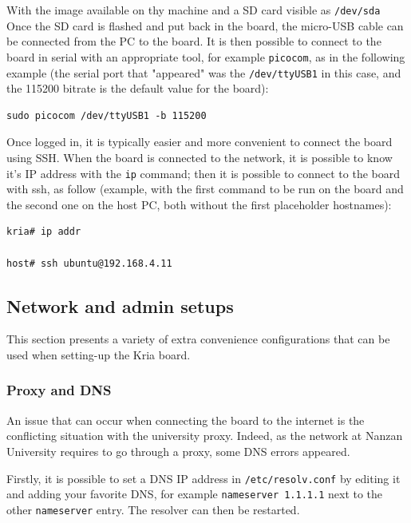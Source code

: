 \documentclass[10pt]{article}
\begin{document}
With the image available on thy machine and a SD card visible as \texttt{/dev/sda}
Once the SD card is flashed and put back in the board, the micro-USB cable can be
connected from the PC to the board. It is then possible to
connect to the board in serial with an appropriate tool, for example \texttt{picocom},
as in the following example (the serial port that "appeared" was the \texttt{/dev/ttyUSB1} in this case,
and the 115200 bitrate is the default value for the board):

\begin{verbatim}
sudo picocom /dev/ttyUSB1 -b 115200
\end{verbatim}

Once logged in, it is typically easier and more convenient to connect the board
using SSH. When the board is connected to the network, it is possible to know
it's IP address with the \texttt{ip} command; then it is possible to connect to
the board with ssh, as follow (example, with the first command to be run on the board
and the second one on the host PC, both without the first placeholder hostnames):


\begin{verbatim}
kria# ip addr

host# ssh ubuntu@192.168.4.11
\end{verbatim}

\subsection{Network and admin setups}
\label{sec:org2ed0e6b}
This section presents a variety of extra convenience configurations
that can be used when setting-up the Kria board.

\subsubsection{Proxy and DNS}
\label{sec:orgc8a7783}
An issue that can occur when connecting the board to the internet is the
conflicting situation with the university proxy.
Indeed, as the network at Nanzan University requires to go through a proxy,
some DNS errors appeared.

Firstly, it is possible to set a DNS IP address in \texttt{/etc/resolv.conf} by
editing it and adding your favorite DNS, for example \texttt{nameserver 1.1.1.1}
next to the other \texttt{nameserver} entry. The resolver can then be restarted.
\end{document}
